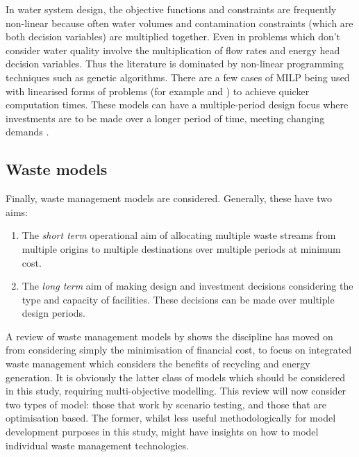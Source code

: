 In water system design, the objective functions and constraints are frequently non-linear because often water volumes and contamination constraints (which are both decision variables) are multiplied together. Even in problems which don't consider water quality involve the multiplication of flow rates and energy head decision variables. Thus the literature is dominated by non-linear programming techniques such as genetic algorithms. There are a few cases of MILP being used with linearised forms of problems (for example \citet{Zanganeh2010} and \citet{Lejano2006}) to achieve quicker computation times. These models can have a multiple-period design focus where investments are to be made over a longer period of time, meeting changing demands \citep{Chung2008}.


\subsection{Waste models}
Finally, waste management models are considered. Generally, these have two aims:
\begin{enumerate}
	\item The \emph{short term} operational aim of allocating multiple waste streams from multiple origins to multiple destinations over multiple periods at minimum cost. 
	\item The \emph{long term} aim of making design and investment decisions considering the type and capacity of facilities. These decisions can be made over multiple design periods.
\end{enumerate}
A review of waste management models by \citet{Morrissey2004} shows the discipline has moved on from considering simply the minimisation of financial cost, to focus on integrated waste management which considers the benefits of recycling and energy generation. It is obviously the latter class of models which should be considered in this study, requiring multi-objective modelling. This review will now consider two types of model: those that work by scenario testing, and those that are optimisation based. The former, whilst less useful methodologically for model development purposes in this study, might have insights on how to model individual waste management technologies.


